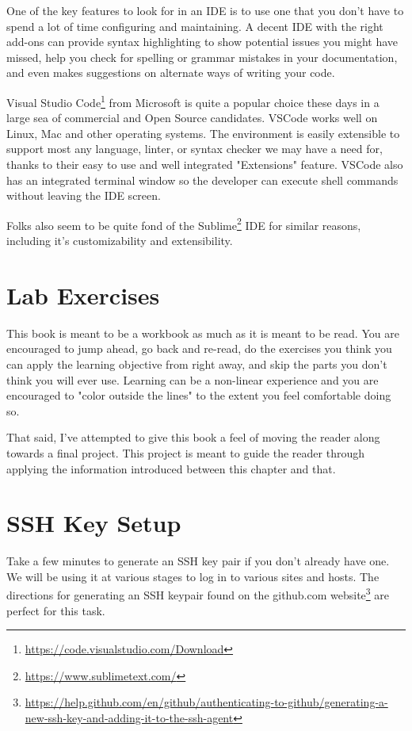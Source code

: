 \justify
One of the key features to look for in an IDE is to use one that you
don't have to spend a lot of time configuring and maintaining. A decent
IDE with the right add-ons can provide syntax highlighting to show
potential issues you might have missed, help you check for spelling or
grammar mistakes in your documentation, and even makes suggestions on
alternate ways of writing your code.

\justify
Visual Studio Code\footnote{\url{https://code.visualstudio.com/Download}}
from Microsoft is quite a popular choice these days in a large sea of
commercial and Open Source candidates. VSCode works well on Linux, Mac
and other operating systems. The environment is easily extensible to
support most any language, linter, or syntax checker we may have a need
for, thanks to their easy to use and well integrated "Extensions"
feature. VSCode also has an integrated terminal window so the developer
can execute shell commands without leaving the IDE screen.

\justify
Folks also seem to be quite fond of the Sublime\footnote{\url{https://www.sublimetext.com/}}
IDE for similar reasons, including it's customizability and extensibility.

\section{Lab Exercises}
\justify
This book is meant to be a workbook as much as it is meant to be read. You are encouraged to jump ahead,
go back and re-read, do the exercises you think you can apply the learning objective from right away, 
and skip the parts you don't think you will ever use. Learning can be a non-linear experience and you 
are encouraged to "color outside the lines" to the extent you feel comfortable doing so.

\justify
That said, I've attempted to give this book a feel of moving the reader along towards a final project. 
This project is meant to guide the reader through applying the information introduced between this chapter 
and that.

\section{SSH Key Setup}
\justify
Take a few minutes to generate an SSH key pair if you don't already have
one. We will be using it at various stages to log in to various sites
and hosts. The directions for generating an SSH keypair found on the
github.com website\footnote{\url{https://help.github.com/en/github/authenticating-to-github/generating-a-new-ssh-key-and-adding-it-to-the-ssh-agent}}
are perfect for this task.

